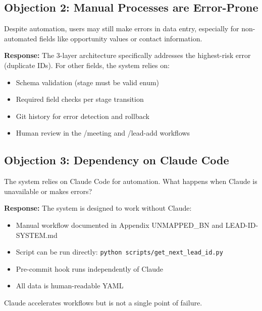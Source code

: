 \subsection{Objection 2: Manual Processes are Error-Prone}

\begin{tcolorbox}[colback=red!5!white, colframe=red!50!black,
    title=Objection: Human error in data entry]
Despite automation, users may still make errors in data entry, especially for non-automated fields like opportunity values or contact information.
\end{tcolorbox}

\textbf{Response:} The 3-layer architecture specifically addresses the highest-risk error (duplicate IDs). For other fields, the system relies on:
\begin{itemize}[nosep]
    \item Schema validation (stage must be valid enum)
    \item Required field checks per stage transition
    \item Git history for error detection and rollback
    \item Human review in the /meeting and /lead-add workflows
\end{itemize}

\subsection{Objection 3: Dependency on Claude Code}

\begin{tcolorbox}[colback=red!5!white, colframe=red!50!black,
    title=Objection: System requires AI assistant]
The system relies on Claude Code for automation. What happens when Claude is unavailable or makes errors?
\end{tcolorbox}

\textbf{Response:} The system is designed to work without Claude:
\begin{itemize}[nosep]
    \item Manual workflow documented in Appendix UNMAPPED_BN and LEAD-ID-SYSTEM.md
    \item Script can be run directly: \texttt{python scripts/get\_next\_lead\_id.py}
    \item Pre-commit hook runs independently of Claude
    \item All data is human-readable YAML
\end{itemize}
Claude accelerates workflows but is not a single point of failure.


